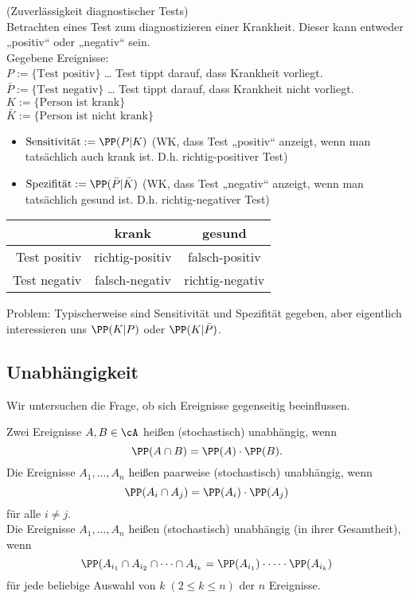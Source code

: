 \documentclass{scrreprt}
\begin{document}
 (Zuverlässigkeit diagnostischer Tests)\\
Betrachten eines Test zum diagnostizieren einer Krankheit. Dieser kann entweder „positiv“ oder „negativ“ sein.\\
Gegebene Ereignisse:\\
$P:=\{\text{Test positiv}\}$ … Test tippt darauf, dass Krankheit vorliegt.\\
$\bar P:=\{\text{Test negativ}\}$ … Test tippt darauf, dass Krankheit nicht vorliegt.\\
$K:= \{\text{Person ist krank}\}$\\
$\bar K:= \{\text{Person ist nicht krank}\}$
\begin{itemize}
\item $\text{Sensitivität}:=\PP(P|K)$ (WK, dass Test „positiv“ anzeigt, wenn man tatsächlich auch krank ist. D.h. richtig-positiver Test)
\item $\text{Spezifität}:=\PP(\bar P|\bar K)$ (WK, dass Test „negativ“ anzeigt, wenn man tatsächlich gesund ist. D.h. richtig-negativer Test)
\end{itemize}
\begin{tabular}{r | c c}
& krank & gesund\\
\hline
Test positiv & richtig-positiv & falsch-positiv\\
Test negativ & falsch-negativ & richtig-negativ
\end{tabular}

Problem: Typischerweise sind Sensitivität und Spezifität gegeben, aber eigentlich interessieren uns $\PP(K|P)$ oder $\PP(K|\bar P)$.

\subsection{Unabhängigkeit}
Wir untersuchen die Frage, ob sich Ereignisse gegenseitig beeinflussen.

 Zwei Ereignisse $A,B \in \cA$ heißen (stochastisch) unabhängig, wenn 
$$\PP(A\cap B)=\PP(A) \cdot \PP(B)\text{.}$$
Die Ereignisse $A_1,\dots, A_n$ heißen paarweise (stochastisch) unabhängig, wenn 
$$\PP(A_i\cap A_j) = \PP(A_i)\cdot \PP(A_j)$$
für alle $i\not=j$.\\
Die Ereignisse $A_1,\dots,A_n$ heißen (stochastisch) unabhängig (in ihrer Gesamtheit), wenn 
$$\PP(A_{i_1}\cap A_{i_2}\cap \dots \cap A_{i_k}=\PP(A_{i_1})\cdot \dots \cdot \PP(A_{i_k})$$
für jede beliebige Auswahl von $k \;(2\leq k \leq n)$ der $n$ Ereignisse.
\end{document}

